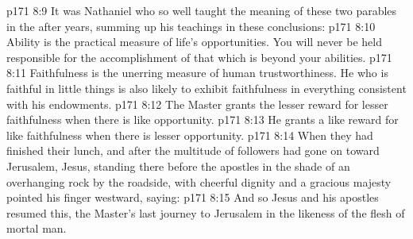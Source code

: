 \vs p171 8:9 It was Nathaniel who so well taught the meaning of these two parables in the after years, summing up his teachings in these conclusions:
\vs p171 8:10 \bibnobreakspace Ability is the practical measure of life’s opportunities. You will never be held responsible for the accomplishment of that which is beyond your abilities.
\vs p171 8:11 \bibnobreakspace Faithfulness is the unerring measure of human trustworthiness. He who is faithful in little things is also likely to exhibit faithfulness in everything consistent with his endowments.
\vs p171 8:12 \bibnobreakspace The Master grants the lesser reward for lesser faithfulness when there is like opportunity.
\vs p171 8:13 \bibnobreakspace He grants a like reward for like faithfulness when there is lesser opportunity.
\vs p171 8:14 \pc When they had finished their lunch, and after the multitude of followers had gone on toward Jerusalem, Jesus, standing there before the apostles in the shade of an overhanging rock by the roadside, with cheerful dignity and a gracious majesty pointed his finger westward, saying: 
\vs p171 8:15 And so Jesus and his apostles resumed this, the Master’s last journey to Jerusalem in the likeness of the flesh of mortal man.
